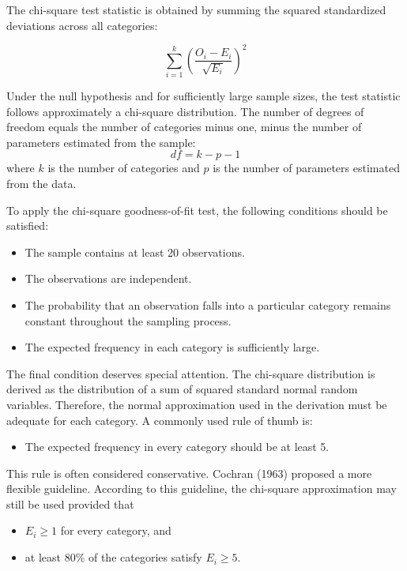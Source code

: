 The chi-square test statistic is obtained by summing the squared standardized deviations across all categories:

\begin{equation*}
    \sum_{i = 1}^{k} \left(\frac{O_i - E_i}{\sqrt{E_i}}\right)^2
\end{equation*}

Under the null hypothesis and for sufficiently large sample sizes, the test statistic follows approximately a chi-square distribution. The number of degrees of freedom equals the number of categories minus one, minus the number of parameters estimated from the sample:
\begin{equation*}
    df = k - p - 1
\end{equation*}
where $k$ is the number of categories and $p$ is the number of parameters estimated from the data.

\medskip
To apply the chi-square goodness-of-fit test, the following conditions should be satisfied:

\begin{itemize}
\item The sample contains at least 20 observations.
\item The observations are independent.
\item The probability that an observation falls into a particular category remains constant throughout the sampling process.
\item The expected frequency in each category is sufficiently large.
\end{itemize}

The final condition deserves special attention. The chi-square distribution is derived as the distribution of a sum of squared standard normal random variables. Therefore, the normal approximation used in the derivation must be adequate for each category. A commonly used rule of thumb is:

\begin{itemize}
\item The expected frequency in every category should be at least 5.
\end{itemize}

This rule is often considered conservative. Cochran (1963) proposed a more flexible guideline. According to this guideline, the chi-square approximation may still be used provided that

\begin{itemize}
\item $E_i \geq 1$ for every category, and
\item at least 80\% of the categories satisfy $E_i \geq 5$.
\end{itemize}

